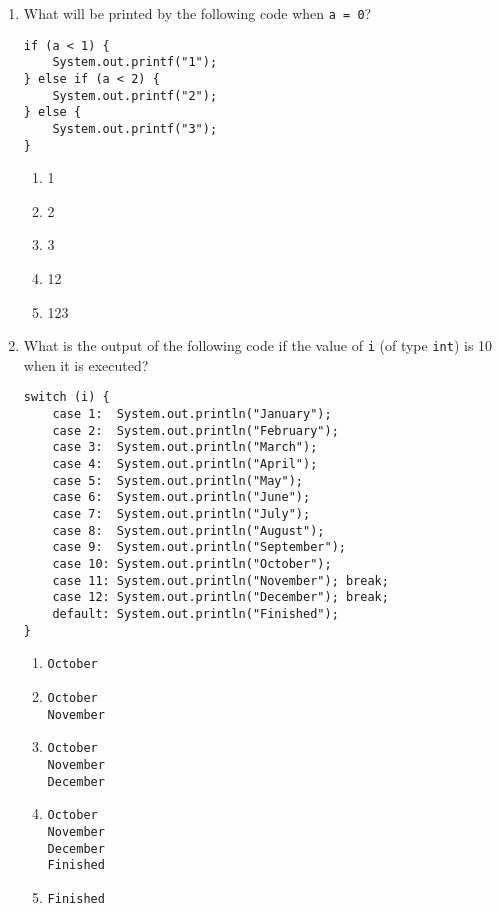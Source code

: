 \documentclass[CS180-S16-FinalExam.tex]{subfiles}
\begin{document}
\begin{enumerate}
\item What will be printed by the following code when \texttt{a = 0}?
\begin{lstlisting}
if (a < 1) {
	System.out.printf("1");
} else if (a < 2) {
	System.out.printf("2");
} else {
	System.out.printf("3");
}
\end{lstlisting}
\begin{enumerate}
\item 1 \ifdraft \Ans \fi
\item 2
\item 3
\item 12
\item 123
\end{enumerate}

\item 
What is the output of the following code if the value of \texttt{i} (of type \texttt{int}) is 10 when it is executed?\begin{lstlisting}
switch (i) {
	case 1:  System.out.println("January");
	case 2:  System.out.println("February");
    case 3:  System.out.println("March");
    case 4:  System.out.println("April");
    case 5:  System.out.println("May");
    case 6:  System.out.println("June");
    case 7:  System.out.println("July");
    case 8:  System.out.println("August");
    case 9:  System.out.println("September");
    case 10: System.out.println("October");
    case 11: System.out.println("November"); break;
    case 12: System.out.println("December"); break;
    default: System.out.println("Finished");
}

\end{lstlisting}
\begin{enumerate}
\item  \texttt{October} 
\item  \texttt{October}\\ \texttt{November} \ifdraft \Ans \fi
\item   \texttt{October}\\ \texttt{November}\\ \texttt{December}
\item  \texttt{October}\\ \texttt{November}\\ \texttt{December}\\ \texttt{Finished}
\item  \texttt{Finished}
\end{enumerate}



\end{enumerate}
\end{document}
